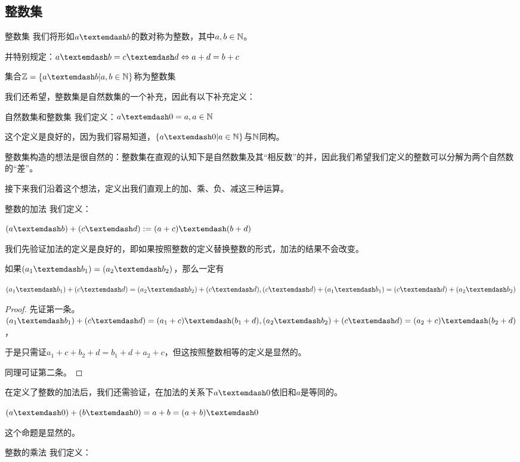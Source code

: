 \documentclass[12pt, a4paper, oneside, UTF8]{ctexbook}
\begin{document}
		\subsection{整数集}
			\begin{para}{0}
					\begin{defn}{整数集}{}
						我们将形如$a\textemdash b$的数对称为整数，其中$a,b \in \mathbb{N}$。
						
						并特别规定：$a\textemdash b = c\textemdash d \Leftrightarrow a+d=b+c$
						
						集合$\Z = \{a\textemdash b| a,b \in \N\}$称为整数集
					\end{defn}
					我们还希望，整数集是自然数集的一个补充，因此有以下补充定义：
					\begin{defn}{自然数集和整数集}{}
						我们定义：$a\textemdash 0 = a,a\in\N$
					\end{defn}
					这个定义是良好的，因为我们容易知道，$\{a\textemdash 0 | a\in\N\}$与$\mathbb{N}$同构。
					
					整数集构造的想法是很自然的：整数集在直观的认知下是自然数集及其“相反数”的并，因此我们希望我们定义的整数可以分解为两个自然数的“差”。
					
					接下来我们沿着这个想法，定义出我们直观上的加、乘、负、减这三种运算。
					\begin{defn}{整数的加法}{}
						我们定义：
						
						$(a\textemdash b)+(c\textemdash d) := (a+c)\textemdash(b+d)$
					\end{defn}
					我们先验证加法的定义是良好的，即如果按照整数的定义替换整数的形式，加法的结果不会改变。
					\begin{proposition}{}
						如果$(a_1\textemdash b_1)=(a_2\textemdash b_2)$，那么一定有
						
						$(a_1\textemdash b_1)+(c\textemdash d)=(a_2\textemdash b_2)+(c\textemdash d),(c\textemdash d)+(a_1\textemdash b_1)=(c\textemdash d)+(a_2\textemdash b_2)$
					\end{proposition}
					\begin{proof}
						先证第一条。$(a_1\textemdash b_1)+(c\textemdash d)=(a_1+c)\textemdash(b_1+d),(a_2\textemdash b_2)+(c\textemdash d)=(a_2+c)\textemdash(b_2+d)$，
						
						于是只需证$a_1+c+b_2+d=b_1+d+a_2+c$，但这按照整数相等的定义是显然的。
						
						同理可证第二条。
					\end{proof}
					在定义了整数的加法后，我们还需验证，在加法的关系下$a \textemdash 0$依旧和$a$是等同的。
					\begin{proposition}
						$(a\textemdash 0)+(b\textemdash 0) = a+b = (a+b)\textemdash 0$
					\end{proposition}
					这个命题是显然的。
					\begin{defn}{整数的乘法}{}
						我们定义：
						

\end{defn}
\end{para}
\end{document}
